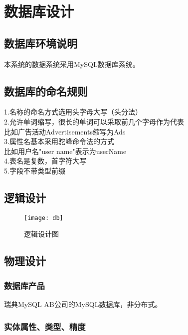 \chapter{数据库设计}
\section{数据库环境说明}
本系统的数据系统采用MySQL数据库系统。


\section{数据库的命名规则}

\indent    1.名称的命名方式选用头字母大写（头分法）\\
\indent    2.允许单词缩写，很长的单词可以采取前几个字母作为代表\\
\indent    比如广告活动Advertisements缩写为Ads\\
\indent    3.属性名基本采用驼峰命令法的方式\\
\indent    比如用户名"user name"表示为userName \\
\indent    4.表名是复数，首字符大写\\
\indent    5.字段不带类型前缀


\section{逻辑设计}
\begin{figure}[H]
\texttt{[image: db]}
\caption{逻辑设计图} \label{fig:figure1}
\end{figure}

\section{物理设计}
\subsection{数据库产品}
瑞典MySQL AB公司的MySQL数据库，非分布式。
\subsection{实体属性、类型、精度}
